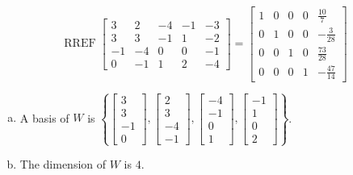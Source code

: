 \begin{exerciseAnswer} 


\[\operatorname{RREF} \left[\begin{array}{ccccc}
3 & 2 & -4 & -1 & -3 \\
3 & 3 & -1 & 1 & -2 \\
-1 & -4 & 0 & 0 & -1 \\
0 & -1 & 1 & 2 & -4
\end{array}\right] = \left[\begin{array}{ccccc}
1 & 0 & 0 & 0 & \frac{10}{7} \\
0 & 1 & 0 & 0 & -\frac{3}{28} \\
0 & 0 & 1 & 0 & \frac{73}{28} \\
0 & 0 & 0 & 1 & -\frac{47}{14}
\end{array}\right] \]


\begin{enumerate}[(a)]
\item A basis of \(W\) is \( \left\{ \left[\begin{array}{c}
3 \\
3 \\
-1 \\
0
\end{array}\right] , \left[\begin{array}{c}
2 \\
3 \\
-4 \\
-1
\end{array}\right] , \left[\begin{array}{c}
-4 \\
-1 \\
0 \\
1
\end{array}\right] , \left[\begin{array}{c}
-1 \\
1 \\
0 \\
2
\end{array}\right] \right\} \).
\item The dimension of \(W\) is \( 4 \).
\end{enumerate}
    
\end{exerciseAnswer}
    
